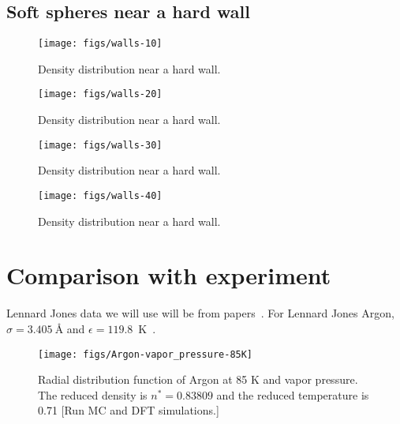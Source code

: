 \documentclass[letterpaper,twocolumn,amsmath,amssymb,prb]{revtex4-1}
\newcommand{\red}[1]{{\color{red} #1}}
\newcommand{\fixme}[1]{\red{[#1]}}
\begin{document}
\subsection{Soft spheres near a hard wall}

\begin{figure}
\begin{center}
\texttt{[image: figs/walls-10]}
\end{center}
\caption{Density distribution near a hard wall.}
\label{fig:walls-10}
\end{figure}

\begin{figure}
\begin{center}
\texttt{[image: figs/walls-20]}
\end{center}
\caption{Density distribution near a hard wall.}
\label{fig:walls-20}
\end{figure}

\begin{figure}
\begin{center}
\texttt{[image: figs/walls-30]}
\end{center}
\caption{Density distribution near a hard wall.}
\label{fig:walls-30}
\end{figure}

\begin{figure}
\begin{center}
\texttt{[image: figs/walls-40]}
\end{center}
\caption{Density distribution near a hard wall.}
\label{fig:walls-40}
\end{figure}

\section{Comparison with experiment}

Lennard Jones data we will use will be from
papers~\cite{mikolaj2004structure, eggert2002quantitative, yarnell1973structure}.
For Lennard Jones Argon, $\sigma = 3.405 ~\textrm{\AA}$ and $\epsilon = 119.8$~K~\cite{verlet1967computer}.
\begin{figure}
\begin{center}
\texttt{[image: figs/Argon-vapor\_pressure-85K]}
\end{center}
\caption{Radial distribution function of Argon at 85 K and vapor
  pressure.  The reduced density is $n^* = 0.83809$ and the reduced
  temperature is 0.71 \fixme{Run MC and DFT simulations.}}
\label{fig:argon-85K}
\end{figure}
\end{document}
